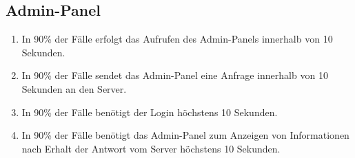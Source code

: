 \subsection{Admin-Panel}

\begin{enumerate}
    \item In 90\% der Fälle erfolgt das Aufrufen des Admin-Panels innerhalb von 10 Sekunden.
    \item In 90\% der Fälle sendet das Admin-Panel eine Anfrage innerhalb von 10 Sekunden an den Server.
    \item In 90\% der Fälle benötigt der Login höchstens 10 Sekunden.
    \item In 90\% der Fälle benötigt das Admin-Panel zum Anzeigen von Informationen nach Erhalt der Antwort vom Server höchstens 10 Sekunden.
\end{enumerate}
